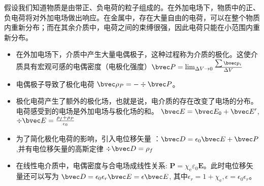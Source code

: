 
假设我们知道物质是由带正、负电荷的粒子组成的。在外加电场下，物质中的正、负电荷将对外加电场做出响应。在金属中，存在大量自由的电荷，可以在整个物质内重新分布；而在其余介质中，电荷之间的束缚很强，因此电荷只能在小范围内重新分布。

\begin{itemize}
\item 在外加电场下，介质中产生大量电偶极子，这种过程称为介质的极化。这使介质具有宏观可感的电偶密度（电极化强度）$\bvec P = \lim_{\Delta V \to 0} \frac{\sum \bvec p_i}{\Delta V}$ 
\item 电偶极子导致了极化电荷 $\bvec \rho_P = - \div \bvec P$。
\item 极化电荷产生了额外的极化场，也就是说，电介质的存在改变了电场的分布。电荷感受到的电场是外加电场与极化场的和。 $\bvec E = \bvec E_0 + \bvec E'$, $\div \bvec E = \frac{\rho_f+\rho_P}{\epsilon_0}$
\item 为了简化极化电荷的影响，引入电位移矢量 ：$\bvec D = \epsilon_0 \bvec E + \bvec P$,并有电位移矢量的高斯定律 $\div \bvec D = \rho_f$
\item 在线性电介质中，电偶密度与合电场成线性关系: $\mathbf P=\chi_{\mathrm e} \varepsilon_{0} \mathbf E$。此时电位移矢量还可以写为 $\bvec D = \epsilon_0 \epsilon_r \bvec E = \epsilon \bvec E $, 其中$\epsilon_r = 1+\chi_{\mathrm e}, \epsilon = \epsilon_0 \epsilon_r$。
\end{itemize}
